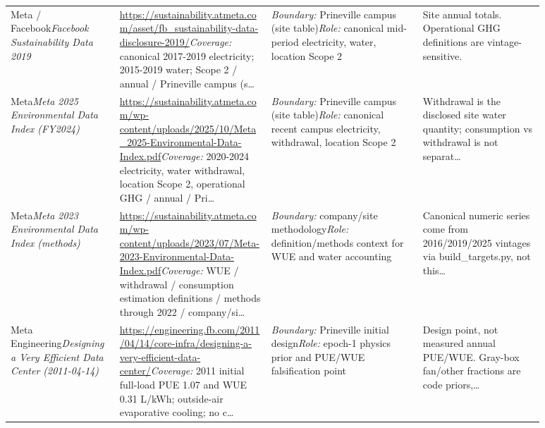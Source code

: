 \documentclass[11pt]{article}
\begin{document}
\begin{longtable}{@{}p{0.18\linewidth}p{0.25\linewidth}p{0.25\linewidth}p{0.20\linewidth}@{}}
Meta / Facebook\newline \textit{Facebook Sustainability Data 2019} & \url{https://sustainability.atmeta.com/asset/fb_sustainability-data-disclosure-2019/}\newline \textit{Coverage:} canonical 2017-2019 electricity; 2015-2019 water; Scope 2 / annual / Prineville campus (s\ldots & \textit{Boundary:} Prineville campus (site table)\newline \textit{Role:} canonical mid-period electricity, water, location Scope 2 & Site annual totals. Operational GHG definitions are vintage-sensitive.\\
Meta\newline \textit{Meta 2025 Environmental Data Index (FY2024)} & \url{https://sustainability.atmeta.com/wp-content/uploads/2025/10/Meta_2025-Environmental-Data-Index.pdf}\newline \textit{Coverage:} 2020-2024 electricity, water withdrawal, location Scope 2, operational GHG / annual / Pri\ldots & \textit{Boundary:} Prineville campus (site table)\newline \textit{Role:} canonical recent campus electricity, withdrawal, location Scope 2 & Withdrawal is the disclosed site water quantity; consumption vs withdrawal is not separat\ldots\\
Meta\newline \textit{Meta 2023 Environmental Data Index (methods)} & \url{https://sustainability.atmeta.com/wp-content/uploads/2023/07/Meta-2023-Environmental-Data-Index.pdf}\newline \textit{Coverage:} WUE / withdrawal / consumption estimation definitions / methods through 2022 / company/si\ldots & \textit{Boundary:} company/site methodology\newline \textit{Role:} definition/methods context for WUE and water accounting & Canonical numeric series come from 2016/2019/2025 vintages via build\_targets.py, not this\ldots\\
Meta Engineering\newline \textit{Designing a Very Efficient Data Center (2011-04-14)} & \url{https://engineering.fb.com/2011/04/14/core-infra/designing-a-very-efficient-data-center/}\newline \textit{Coverage:} 2011 initial full-load PUE 1.07 and WUE 0.31 L/kWh; outside-air evaporative cooling; no c\ldots & \textit{Boundary:} Prineville initial design\newline \textit{Role:} epoch-1 physics prior and PUE/WUE falsification point & Design point, not measured annual PUE/WUE. Gray-box fan/other fractions are code priors,\ldots\\

\end{longtable}
\end{document}

